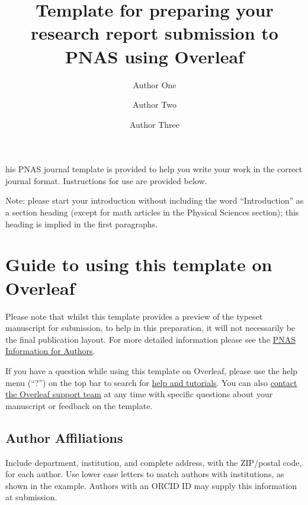 \documentclass[9pt,twocolumn,twoside]{pnas-new}
\title{Template for preparing your research report submission to PNAS using Overleaf}
\author[a,c,1]{Author One}
\author[b,1,2]{Author Two}
\author[a]{Author Three}
\affil[a]{Affiliation One}
\affil[b]{Affiliation Two}
\affil[c]{Affiliation Three}
\begin{document}
\verticaladjustment{-2pt}

\maketitle
\thispagestyle{firststyle}

his PNAS journal template is provided to help you write your work in the correct journal format.  Instructions for use are provided below.

Note: please start your introduction without including the word ``Introduction'' as a section heading (except for math articles in the Physical Sciences section); this heading is implied in the first paragraphs. 

\section*{Guide to using this template on Overleaf}

Please note that whilst this template provides a preview of the typeset manuscript for submission, to help in this preparation, it will not necessarily be the final publication layout. For more detailed information please see the \href{http://www.pnas.org/site/authors/format.xhtml}{PNAS Information for Authors}.

If you have a question while using this template on Overleaf, please use the help menu (``?'') on the top bar to search for \href{https://www.overleaf.com/help}{help and tutorials}. You can also \href{https://www.overleaf.com/contact}{contact the Overleaf support team} at any time with specific questions about your manuscript or feedback on the template.

\subsection*{Author Affiliations}

Include department, institution, and complete address, with the ZIP/postal code, for each author. Use lower case letters to match authors with institutions, as shown in the example. Authors with an ORCID ID may supply this information at submission.
\end{document}
